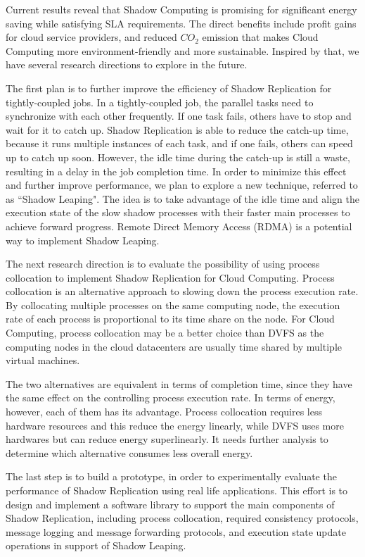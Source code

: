 Current results reveal that Shadow Computing is promising for significant energy saving while satisfying SLA requirements. The direct benefits include profit gains for cloud service providers, and reduced $CO_2$ emission that makes Cloud Computing more environment-friendly and more sustainable. Inspired by that, we have several research directions to explore in the future.

The first plan is to further improve the efficiency of Shadow Replication for tightly-coupled jobs. In a tightly-coupled job, the parallel tasks need to synchronize with each other frequently. If one task fails, others have to stop and wait for it to catch up. Shadow Replication is able to reduce the catch-up time, because it runs multiple instances of each task, and if one fails, others can speed up to catch up soon. However, the idle time during the catch-up is still a waste, resulting in a delay in the job completion time. In order to minimize this effect and further improve performance, we plan to explore a new technique, referred to as ``Shadow Leaping". The idea is to take advantage of the idle time and align the execution state of the slow shadow processes with their faster main processes to achieve forward progress. Remote Direct Memory Access (RDMA) is a potential way to implement Shadow Leaping.

The next research direction is to evaluate the possibility of using process collocation to implement Shadow Replication for Cloud Computing. Process collocation is an alternative approach to slowing down the process execution rate. By collocating multiple processes on the same computing node, the execution rate of each process is proportional to its time share on the node. For Cloud Computing, process collocation may be a better choice than DVFS as the computing nodes in the cloud datacenters are usually time shared by multiple virtual machines. 

The two alternatives are equivalent in terms of completion time, since they have the same effect on the controlling process execution rate. In terms of energy, however, each of them has its advantage. Process collocation requires less hardware resources and this reduce the energy linearly, while DVFS uses more hardwares but can reduce energy superlinearly. It needs further analysis to determine which alternative consumes less overall energy. 

The last step is to build a prototype, in order to experimentally evaluate the performance of Shadow Replication using real life applications. This effort is to design and implement a software library to support the main components of Shadow Replication, including process collocation, required consistency protocols, message logging and message forwarding protocols, and execution state update operations in support of Shadow Leaping. 




